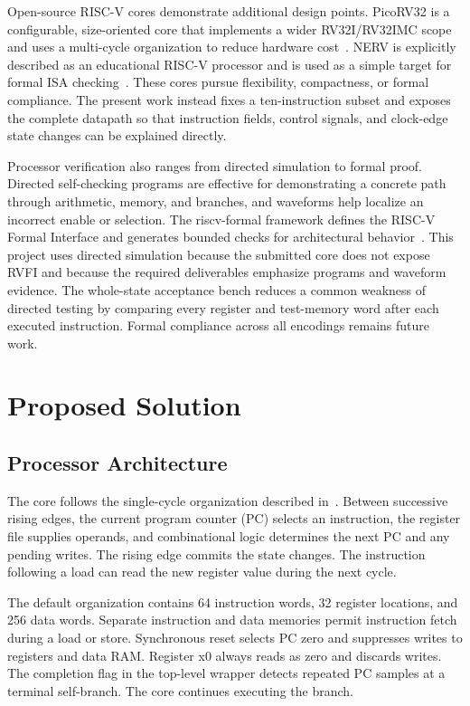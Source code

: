 \documentclass[conference,letterpaper]{IEEEtran}
\begin{document}
Open-source RISC-V cores demonstrate additional design points. PicoRV32 is a configurable, size-oriented core that implements a wider RV32I/RV32IMC scope and uses a multi-cycle organization to reduce hardware cost~\cite{picorv32}. NERV is explicitly described as an educational RISC-V processor and is used as a simple target for formal ISA checking~\cite{nerv}. These cores pursue flexibility, compactness, or formal compliance. The present work instead fixes a ten-instruction subset and exposes the complete datapath so that instruction fields, control signals, and clock-edge state changes can be explained directly.

Processor verification also ranges from directed simulation to formal proof. Directed self-checking programs are effective for demonstrating a concrete path through arithmetic, memory, and branches, and waveforms help localize an incorrect enable or selection. The riscv-formal framework defines the RISC-V Formal Interface and generates bounded checks for architectural behavior~\cite{riscvformal}. This project uses directed simulation because the submitted core does not expose RVFI and because the required deliverables emphasize programs and waveform evidence. The whole-state acceptance bench reduces a common weakness of directed testing by comparing every register and test-memory word after each executed instruction. Formal compliance across all encodings remains future work.

\section{Proposed Solution}
\subsection{Processor Architecture}

The core follows the single-cycle organization described in~\cite{cod}. Between successive rising edges, the current program counter (PC) selects an instruction, the register file supplies operands, and combinational logic determines the next PC and any pending writes. The rising edge commits the state changes. The instruction following a load can read the new register value during the next cycle.

The default organization contains 64 instruction words, 32 register locations, and 256 data words. Separate instruction and data memories permit instruction fetch during a load or store. Synchronous reset selects PC zero and suppresses writes to registers and data RAM. Register x0 always reads as zero and discards writes. The completion flag in the top-level wrapper detects repeated PC samples at a terminal self-branch. The core continues executing the branch.
\end{document}
